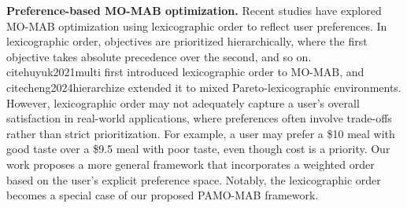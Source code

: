 
\vspace{-2pt}
\textbf{Preference-based MO-MAB optimization.}
Recent studies have explored MO-MAB optimization using lexicographic order \cite{ehrgott2005multicriteria} to reflect user preferences. In lexicographic order, objectives are prioritized hierarchically, where the first objective takes absolute precedence over the second, and so on. cite{huyuk2021multi} first introduced lexicographic order to MO-MAB, and cite{cheng2024hierarchize} extended it to mixed Pareto-lexicographic environments.
However, lexicographic order may not adequately capture a user's overall satisfaction in real-world applications, where preferences often involve trade-offs rather than strict prioritization. For example, a user may prefer a \$10 meal with good taste over a \$9.5 meal with poor taste, even though cost is a priority.
Our work proposes a more general framework that incorporates a weighted order based on the user's explicit preference space. Notably, the lexicographic order becomes a special case of our proposed PAMO-MAB framework.


